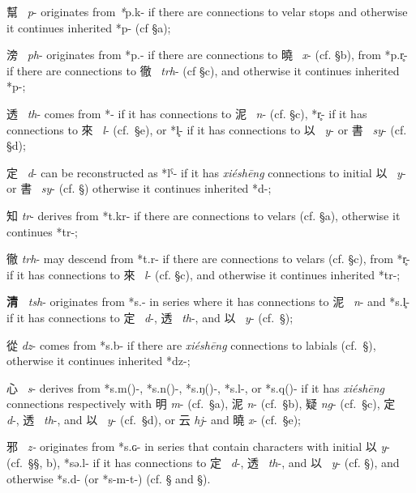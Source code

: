 \begin{description} \item
幫~ \emph{p}-\emph{ }originates from  \emph{*}p.k-\emph{ }if there are
connections to velar stops and otherwise it continues inherited *p- (cf
§a);
\item
滂~ \emph{ph}-\emph{ }originates from *p.{}{}- if there are connections to
曉~ \emph{x}- (cf. §b), from *p.r̥- if there are connections to
徹~ \emph{trh}- (cf §c), and otherwise it continues inherited *p{}-;
\item
透~ \emph{th}- comes from *{}- if it has con­nec­tions to 泥~ \emph{n}-
(cf. §c), *r̥{}- if it has connections to 來~ \emph{l}- (cf.~§e), or *l̥{}-
if it has con­nec­tions to 以~ \emph{y}- or 書~ \emph{sy}- (cf. §d);
\item
定~ \emph{d}- can be re­con­structed as *lˁ- if it has \emph{xiéshēng} con­nec­tions to initial 以~ \emph{y}- or 書~ \emph{sy}- (cf. §)
otherwise it continues inherited *d-;
\item
知 \emph{tr}- derives from *t.kr- if there are connections to velars
(cf. §a), otherwise it continues *tr-;
\item
徹  \emph{trh}- may descend from *t.{}r- if there are connections to
velars (cf. §c), from *r̥- if it has connections to 來~ \emph{l}- (cf.
§c), and otherwise it continues inherited *t{}r-;
\item
\textbf{清~} \emph{tsh}- originates from *s.{}- in
series where it has con­nec­tions to 泥~ \emph{n}- and *s.l̥- if it has
con­nec­tions to 定~ \emph{d}-, 透~ \emph{th}-, and 以~ \emph{y}- (cf.~§);
\item
從  \emph{dz}- comes from *s.b- if there are  \emph{xiéshēng }connections
to labials (cf.~§), otherwise it continues inherited *dz-;
\item
心~ \emph{s}- derives from *s.m({})-, *s.n({})-, *s.ŋ({})-, *s.l{}-, or
*s.q{}({})- if it has \emph{xiéshēng }connections respectively with 明
\emph{m}- (cf.~§a), 泥 \emph{n}- (cf.~§b), 疑  \emph{ng}- (cf.~§c),
定~ \emph{d}-, 透~ \emph{th}-, and 以~ \emph{y}- (cf.~§d), or 云 \emph{hj}-
and 曉 \emph{x}- (cf.~§e);
\item
邪~ \emph{z-} originates from *s.ɢ- in series that
contain characters with initial 以  \emph{y}- (cf.~§§, b), *sə.l- if it
has con­nec­tions to 定~ \emph{d}-, 透~ \emph{th}-, and 以~ \emph{y}- (cf.
§), and otherwise *s.d- (or *s-m-t-) (cf. § and §).
\item

\end{description}

